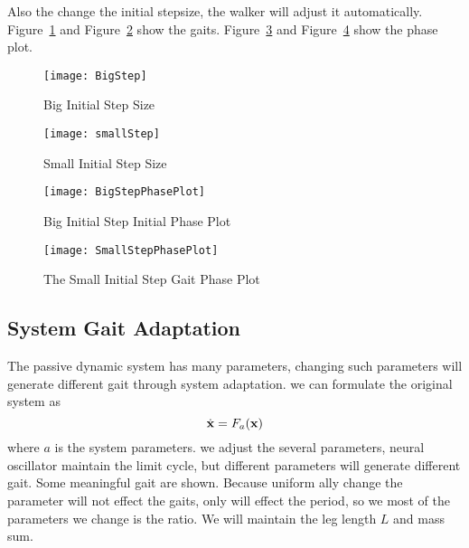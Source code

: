 Also the change the initial stepsize, the walker will adjust it automatically.
Figure~\ref{fig:bigStepIni} and Figure~\ref{fig:smallStepini} show the gaits.
Figure~\ref{fig:bigstepiniGaitPlot} and Figure~\ref{fig:smallstepiniPhasePlot} show the phase plot.

\begin{figure}[!htbp]
  \begin{center}
      \texttt{[image: BigStep]}
    \caption{Big Initial Step Size}
    \label{fig:bigStepIni}
\end{center}
\end{figure}


\begin{figure}[!htbp]
  \begin{center}
      \texttt{[image: smallStep]}
    \caption{Small Initial Step Size}
    \label{fig:smallStepini}
\end{center}
\end{figure}


\begin{figure}[!htbp]
  \begin{center}
      \texttt{[image: BigStepPhasePlot]}
    \caption{Big Initial Step Initial Phase Plot}
    \label{fig:bigstepiniGaitPlot}
\end{center}
\end{figure}


\begin{figure}[!htbp]
  \begin{center}
      \texttt{[image: SmallStepPhasePlot]}
    \caption{The Small Initial Step Gait Phase Plot}
    \label{fig:smallstepiniPhasePlot}
\end{center}
\end{figure}







\subsection{System Gait Adaptation}
The passive dynamic system has many parameters, changing such parameters will generate different gait through system adaptation.
we can formulate the original system as
\[
\dot{\mathbf{x}}=F_a(\mathbf{x})
\]
where $a$ is the system parameters.
we adjust the several parameters, neural oscillator maintain the limit cycle, but different parameters will generate different gait.
Some meaningful gait are shown.
Because uniform ally change the parameter will not effect the gaits, only will effect the period, so we most of the parameters we change is the ratio.
We will maintain the leg length $L$ and mass sum.

